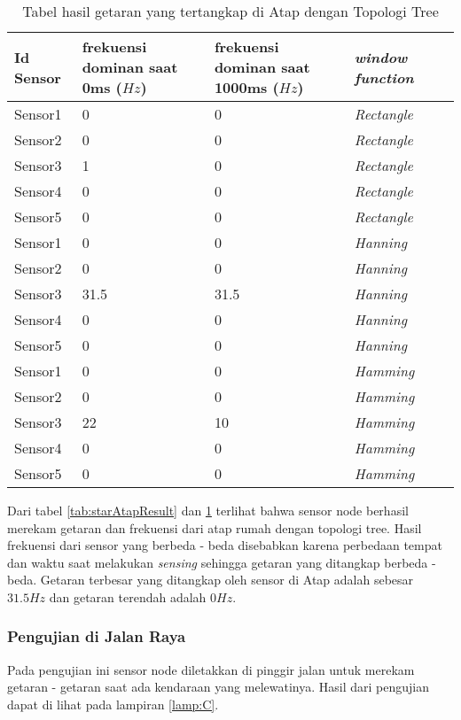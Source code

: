 \begin{itemize}
\begin{table}[H]
    \centering
    \caption{Tabel hasil getaran yang tertangkap di Atap dengan Topologi Tree}
    \begin{tabular}{|p{3cm}|p{3cm}|p{3cm}|p{3cm}|p{3cm}|}
    \hline Id Sensor & frekuensi dominan saat 0ms ($Hz$)& frekuensi dominan saat 1000ms ($Hz$)& {\it window function}\\
    \hline Sensor1 & 0 & 0 & {\it Rectangle} \\
    \hline Sensor2 & 0 & 0 & {\it Rectangle} \\
    \hline Sensor3 & 1 & 0 & {\it Rectangle} \\
    \hline Sensor4 & 0 & 0 & {\it Rectangle} \\
    \hline Sensor5 & 0 & 0 & {\it Rectangle} \\
    \hline Sensor1 & 0 & 0 & {\it Hanning} \\
    \hline Sensor2 & 0 & 0 & {\it Hanning} \\
    \hline Sensor3 & 31.5 & 31.5 & {\it Hanning} \\
    \hline Sensor4 & 0 & 0 & {\it Hanning} \\
    \hline Sensor5 & 0 & 0 & {\it Hanning} \\
    \hline Sensor1 & 0 & 0 & {\it Hamming} \\
    \hline Sensor2 & 0 & 0 & {\it Hamming} \\
    \hline Sensor3 & 22 & 10 & {\it Hamming} \\
    \hline Sensor4 & 0 & 0 & {\it Hamming} \\
    \hline Sensor5 & 0 & 0 & {\it Hamming} \\
    \hline
    \end{tabular}
    \label{tab:treeAtapResult}
\end{table}

Dari tabel \ref{tab:starAtapResult} dan \ref{tab:treeAtapResult} terlihat bahwa sensor node berhasil merekam getaran dan frekuensi dari atap rumah dengan topologi tree. Hasil frekuensi dari sensor yang berbeda - beda disebabkan karena perbedaan tempat dan waktu saat melakukan {\it sensing} sehingga getaran yang ditangkap berbeda - beda. Getaran terbesar yang ditangkap oleh sensor di Atap adalah sebesar $31.5Hz$ dan getaran terendah adalah $0Hz$.
\end{itemize}

\subsubsection{Pengujian di Jalan Raya}
Pada pengujian ini sensor node diletakkan di pinggir jalan untuk merekam getaran - getaran saat ada kendaraan yang melewatinya. Hasil dari pengujian dapat di lihat pada lampiran \ref{lamp:C}.

